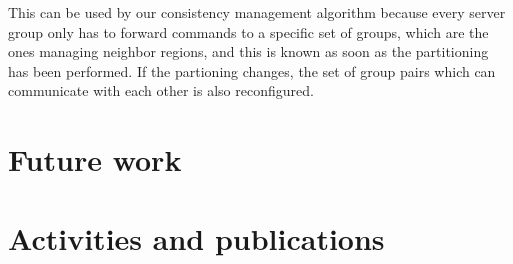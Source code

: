 \documentclass[]{usiinfprospectus}
\begin{document}
This can be used by our consistency management algorithm because every server group only has to forward commands to a specific set of groups, which are the ones managing neighbor regions, and this is known as soon as the partitioning has been performed. If the partioning changes, the set of group pairs which can communicate with each other is also reconfigured.



% 
% 
% 
% 
% 
% 
% 
% 
% 
% 
% 

\section{Future work} \label{sec:futurework}

\section{Activities and publications} \label{sec:achievements}



\end{document}
